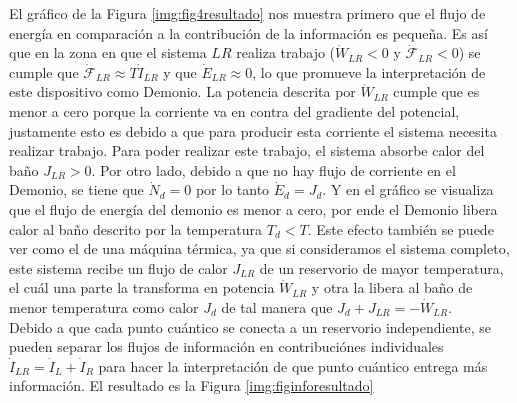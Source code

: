 El gráfico de la Figura \ref{img:fig4resultado} nos muestra primero que el flujo de energía en comparación a la contribución de la información es pequeña. Es así que en la zona en que el sistema $LR$ realiza trabajo ($\dot{W}_{LR}<0$ y  $\dot{\mathcal{F}}_{LR}<0$) se cumple que $\dot{\mathcal{F}}_{LR}\approx T\dot{I}_{LR}$ y que $\dot{E}_{LR}\approx 0$, lo que promueve la interpretación de este dispositivo como Demonio. La potencia descrita por $\dot{W}_{LR}$ cumple que es menor a cero porque la corriente va en contra del gradiente del potencial, justamente esto es debido a que para producir esta corriente el sistema necesita realizar trabajo. Para poder realizar este trabajo, el sistema absorbe calor del baño $J_{LR}>0$. Por otro lado, debido a que no hay flujo de corriente en el Demonio, se tiene que $\dot{N}_{d}=0$ por lo tanto  $\dot{E}_{d} = J_{d}$. Y en el gráfico se visualiza que el flujo de energía del demonio es menor a cero, por ende el Demonio libera calor al baño descrito por la temperatura $T_{d}<T$. Este efecto también se puede ver como el de una máquina térmica, ya que si consideramos el sistema completo, este sistema recibe un flujo de calor $J_{LR}$ de un reservorio de mayor temperatura, el cuál una parte la transforma en potencia $\dot{W}_{LR}$ y otra la libera al baño de menor temperatura como calor $J_{d}$ de tal manera que $J_{d} + J_{LR} = - \dot{W}_{LR}$.\\
Debido a que cada punto cuántico se conecta a un reservorio independiente, se pueden separar los flujos de información en contribuciónes individuales $\dot{I}_{LR} = \dot{I}_{L}+\dot{I}_{R}$ para hacer la interpretación de que punto cuántico entrega más información. El resultado es la Figura \ref{img:figinforesultado}
  

